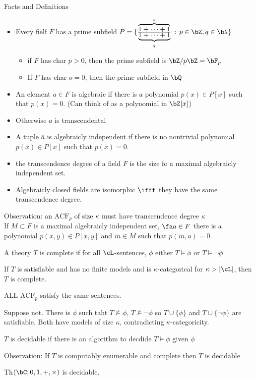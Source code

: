 \noindent
Facts and Definitions 
\begin{itemize}
    \item Every fielf $F$ has a prime subfield $P = \{ \frac{\overbrace{1 + \cdots + 1}^p}{\underbrace{1 + \cdots + 1}_q} \, : \, p \in \bZ, q \in \bN \}$ 
    \begin{itemize}
        \item if $F$ has char $p > 0$, then the prime subfield is $\bZ/p\bZ = \bF_p$ 
        \item If $F$ has char $o=0$, then the prime subfield in $\bQ$ 
    \end{itemize}
    \item An element $a \in F$ is algebraic if there is a polynomial $p(x) \in P[x]$ such that $p(x)=0$. (Can think of as a polynomial in $\bZ[x]$) 
    \item Otherwise $a$ is transcendental 
    \item A tuple $\overline{a}$ is algebraicly independent if there is no nontrivial polynomial $p(\overline{x}) \in P[x]$ such that $p(\overline{x})=0$. 
    \item the transcendence degree of a field $F$ is the size fo a maximal algebraicly independent set. 
    \item Algebraicly closed fields are isomorphic $\ifff$ they have the same transcendence degree. 
\end{itemize}
Observation: an $\text{ACF}_p$ of size $\kappa$ must have transcendence degree $\kappa$ \\
If $M \subset F$ is a maximal algebraicly independent set, $\fa a \in F$ there is a polynomial $p(\overline{x}, y) \in P[\overline{x},y]$ and $\overline{m} \in M$ such that $p(\overline{m}, a)=0$. 

\begin{definition}
    A theory $T$ is complete if for all $\cL$-sentences, $\phi$ either $T \models \phi$ or $T \models \neg \phi$
\end{definition}

\begin{theorem}
    If $T$ is satisfiable and has no finite models and is $\kappa$-categorical for $\kappa > | \cL |$, then $T$ is complete. 
\end{theorem}

\begin{corollary}
    ALL $\text{ACF}_p$ satisfy the same sentences. 
\end{corollary}

\begin{pf} 
    Suppose not. There is $\phi$ such taht $T \not\models \phi$, $T \not\models \neg \phi$ so $T \cup \{ \phi\}$ and $T \cup \{ \neg \phi\}$ are satisfiable. Both have models of size $\kappa$, contradicting $\kappa$-categoricity. 
\end{pf}    

\begin{definition}
    $T$ is decidable if there is an algorithm to decdide $T \models \phi$ given $\phi$ 
\end{definition}

\noindent
Observation: If $T$ is computably enumerable and complete then $T$ is decidable 

\begin{corollary}
    Th$(\bC; 0, 1, +, \times)$ is decidable.
\end{corollary}